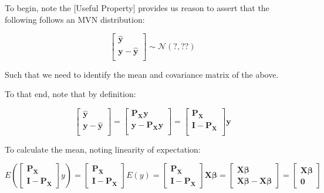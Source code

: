 \documentclass[
]{article}
\begin{document}
To begin, note the {[}Useful Property{]} provides us reason to assert
that the following follows an MVN distribution:

\[
\begin{bmatrix}
\boldsymbol{\hat{y}} \\ 
\boldsymbol{y - \hat{y}} \\ 
\end{bmatrix}
\sim \mathcal{N}(?, ??)
\]

Such that we need to identify the mean and covariance matrix of the
above.

To that end, note that by definition:

\[
\begin{bmatrix}
\boldsymbol{\hat{y}} \\ 
\boldsymbol{y - \hat{y}} \\ 
\end{bmatrix}
= 
\begin{bmatrix}
\boldsymbol{P_{X}y} \\ 
\boldsymbol{y} - \boldsymbol{P_{X}y} \\ 
\end{bmatrix}
= 
\begin{bmatrix}
\boldsymbol{P_{X}} \\ 
\boldsymbol{I} - \boldsymbol{P_{X}} \\ 
\end{bmatrix} \boldsymbol{y}
\]

To calculate the mean, noting linearity of expectation:

\[
E \left( \begin{bmatrix} \boldsymbol{P_X} \\ \boldsymbol{I} - \boldsymbol{P_X} \end{bmatrix} y \right)
= \begin{bmatrix} \boldsymbol{P_X} \\ \boldsymbol{I} - \boldsymbol{P_X} \end{bmatrix} E(y)
= \begin{bmatrix} \boldsymbol{P_X} \\ \boldsymbol{I} - \boldsymbol{P_X} \end{bmatrix} \boldsymbol{X} \boldsymbol{\beta}
= \begin{bmatrix} \boldsymbol{X} \boldsymbol{\beta} \\ \boldsymbol{X} \boldsymbol{\beta} - \boldsymbol{X} \boldsymbol{\beta} \end{bmatrix}
= \begin{bmatrix} \boldsymbol{X} \boldsymbol{\beta} \\ \boldsymbol{0} \end{bmatrix}
\]
\end{document}
